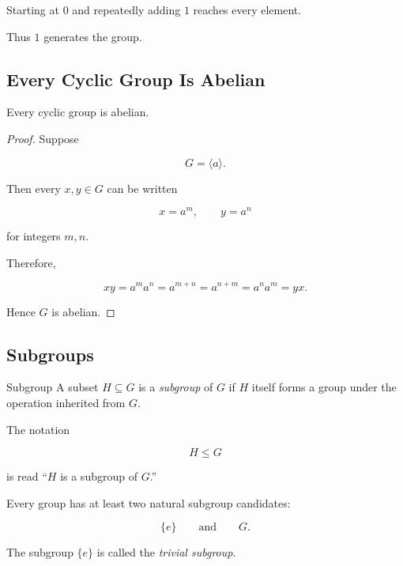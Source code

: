 Starting at \(0\) and repeatedly adding \(1\) reaches every element.

Thus \(1\) generates the group.

\subsection{Every Cyclic Group Is Abelian}
\label{subsec:cyclic-groups-abelian}

\begin{theorem}
Every cyclic group is abelian.
\end{theorem}

\begin{proof}
Suppose

\[ G=\langle a\rangle. \]

Then every \(x,y\in G\) can be written

\[ x=a^m,\qquad y=a^n \]

for integers \(m,n\).

Therefore,

\[ xy=a^ma^n=a^{m+n}=a^{n+m}=a^na^m=yx. \]

Hence \(G\) is abelian.
\end{proof}

\subsection{Subgroups}
\label{subsec:subgroups}

\begin{definitionbox}{Subgroup}
A subset \(H\subseteq G\) is a \emph{subgroup} of \(G\) if \(H\) itself forms
a group under the operation inherited from \(G\).
\end{definitionbox}

The notation

\[ H\leq G \]

is read ``\(H\) is a subgroup of \(G\).''

Every group has at least two natural subgroup candidates:

\[ \{e\}\qquad\text{and}\qquad G. \]

The subgroup \(\{e\}\) is called the \emph{trivial subgroup}.


